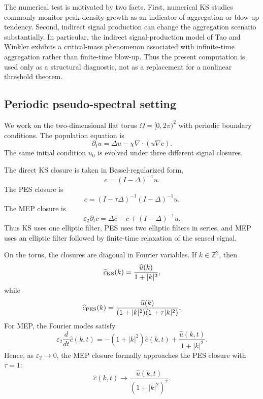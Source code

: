 \documentclass[pdflatex,sn-mathphys-num]{sn-jnl}%
\theoremstyle{thmstyleone}
\theoremstyle{thmstyletwo}
\theoremstyle{thmstylethree}
\begin{document}
The numerical test is motivated by two facts.  First, numerical KS
studies commonly monitor peak-density growth as an indicator of aggregation or
blow-up tendency.  Second, indirect signal production can change the aggregation
scenario substantially.  In particular, the indirect signal-production model of
Tao and Winkler \cite{tao2017critical} exhibits a critical-mass phenomenon associated with
infinite-time aggregation rather than finite-time blow-up.  Thus the present
computation is used only as a structural diagnostic, not as a replacement for a
nonlinear threshold theorem.

\subsection{Periodic pseudo-spectral setting}

We work on the two-dimensional flat torus $\Omega=[0,2\pi)^2$ with periodic boundary conditions.  The population equation is
\begin{equation}
\label{eq:numerical-u-equation}
        \partial_t u
        =
        \Delta u-\chi\nabla\cdot(u\nabla c).
\end{equation}
The same initial condition \(u_0\) is evolved under three different signal
closures.

The direct KS closure is taken in Bessel-regularized form,
\begin{equation}
\label{eq:numerical-KS}
        c=(I-\Delta)^{-1}u.
\tag{KS}
\end{equation}
The PES closure is
\begin{equation}
\label{eq:numerical-PES}
        c=(I-\tau\Delta)^{-1}(I-\Delta)^{-1}u.
\tag{PES}
\end{equation}
The MEP closure is
\begin{equation}
\label{eq:numerical-MEP}
        \varepsilon_2\partial_t c
        =
        \Delta c-c+(I-\Delta)^{-1}u.
\tag{MEP}
\end{equation}
Thus KS uses one elliptic filter, PES uses two elliptic filters in series, and
MEP uses an elliptic filter followed by finite-time relaxation of the sensed
signal.

On the torus, the closures are diagonal in Fourier variables.  If \(k\in
\mathbb Z^2\), then
\[
        \widehat c_{\rm KS}(k)
        =
        \frac{\widehat u(k)}{1+|k|^2},
\]
while
\[
        \widehat c_{\rm PES}(k)
        =
        \frac{\widehat u(k)}
        {(1+|k|^2)(1+\tau |k|^2)}.
\]
For MEP, the Fourier modes satisfy
\[
        \varepsilon_2\frac{d}{dt}\widehat c(k,t)
        =
        -(1+|k|^2)\widehat c(k,t)
        +
        \frac{\widehat u(k,t)}{1+|k|^2}.
\]
Hence, as \(\varepsilon_2\to0\), the MEP closure formally approaches the PES
closure with \(\tau=1\):
\[
        \widehat c(k,t)
        \to
        \frac{\widehat u(k,t)}{(1+|k|^2)^2}.
\]
\end{document}
